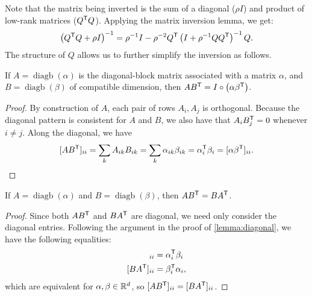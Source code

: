 \documentclass{article}
\DeclareMathOperator{\diagb}{diagb}
\begin{document}
Note that the matrix being inverted is the sum of a diagonal ($\rho I$) and product of low-rank matrices
($Q^\mathsf{T} Q$).  Applying the matrix inversion lemma, we get:
\[
\left( Q^\mathsf{T} Q + \rho I \right)^{-1} = \rho^{-1} I - \rho^{-2} Q^\mathsf{T} \left(I + \rho^{-1} QQ^\mathsf{T} \right)^{-1} Q.
\]
The structure of $Q$ allows us to further simplify the inversion as follows.

\begin{lemma}
If $A = \diagb(\alpha)$ is the diagonal-block matrix associated with a matrix $\alpha$, and $B = \diagb(\beta)$ of compatible dimension, then $AB^\mathsf{T} = I\circ \left(\alpha\beta^\mathsf{T}\right)$.\label{lemma:diagonal}
\end{lemma}
\begin{proof}
By construction of $A$, each pair of rows $A_i, A_j$ is orthogonal.  Because the diagonal pattern is consistent for $A$ and $B$, we also have that $A_i B^\mathsf{T}_j = 0$ whenever $i \neq j$.
Along the diagonal, we have
\[
[AB^\mathsf{T}]_{ii} = \sum_k A_{ik} B_{ik} = \sum_k \alpha_{ik} \beta_{ik} = \alpha_i^\mathsf{T} \beta_i = [\alpha\beta^\mathsf{T}]_{ii}.
\]
\end{proof}
\begin{lemma}
If $A=\diagb(\alpha)$ and $B=\diagb(\beta)$, then ${AB^\mathsf{T} = BA^\mathsf{T}}$.\label{cor:symmetry}
\end{lemma}
\begin{proof}
Since both $AB^\mathsf{T}$ and $BA^\mathsf{T}$ are diagonal, we need only consider the diagonal entries. 
Following the argument in the proof of \autoref{lemma:diagonal}, we have the following equalities:
\begin{align*}
[AB\trans]_{ii} &= \alpha_i\trans \beta_i\\
[BA\trans]_{ii} &= \beta_i\trans \alpha_i,
\end{align*}
which are equivalent for $\alpha, \beta \in \mathbb{R}^d$, so $[AB^\mathsf{T}]_{ii} = [BA^\mathsf{T}]_{ii}$.
\end{proof}
\end{document}

